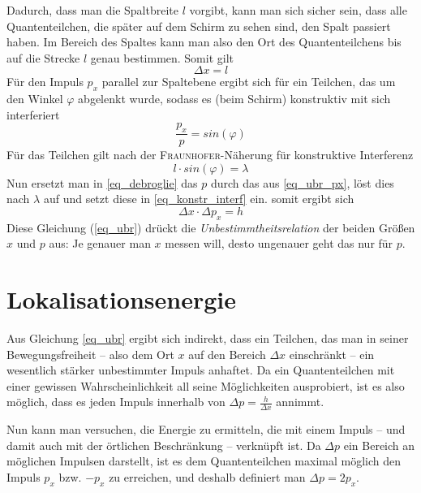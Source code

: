 Dadurch, dass man die Spaltbreite $l$ vorgibt, kann man sich sicher sein, dass alle Quantenteilchen, die später auf dem Schirm zu sehen sind, den Spalt passiert haben. Im Bereich des Spaltes kann man also den Ort des Quantenteilchens bis auf die Strecke $l$ genau bestimmen. Somit gilt 
\begin{equation}
   \Delta x = l
   \label{eq_ubr_x}
\end{equation}
Für den Impuls $p_x$ parallel zur Spaltebene ergibt sich für ein Teilchen, das um den Winkel $\varphi$ abgelenkt wurde, sodass es (beim Schirm) konstruktiv mit sich interferiert
\begin{equation}
   \frac{p_x}{p} = sin(\varphi)
   \label{eq_ubr_px}
\end{equation}
Für das Teilchen gilt nach der \textsc{Fraunhofer}-Näherung für konstruktive Interferenz
\begin{equation}
l \cdot sin(\varphi) = \lambda   
\label{eq_konstr_interf}
\end{equation}
Nun ersetzt man in \ref{eq_debroglie} das $p$ durch das aus \ref{eq_ubr_px}, löst dies nach $\lambda$ auf und setzt diese in \ref{eq_konstr_interf} ein. somit ergibt sich
\begin{equation}
   \Delta x \cdot \Delta p_x = h
   \label{eq_ubr}
\end{equation}
Diese Gleichung (\ref{eq_ubr}) drückt die \emph{Unbestimmtheitsrelation} der beiden Größen $x$ und $p$ aus: Je genauer man $x$ messen will, desto ungenauer geht das nur für $p$.





	\section{Lokalisationsenergie}

Aus Gleichung \ref{eq_ubr} ergibt sich indirekt, dass ein Teilchen, das man in seiner Bewegungsfreiheit -- also dem Ort $x$ auf den Bereich $\Delta x$ einschränkt -- ein wesentlich stärker unbestimmter Impuls anhaftet. Da ein Quantenteilchen mit einer gewissen Wahrscheinlichkeit all seine Möglichkeiten ausprobiert, ist es also möglich, dass es jeden Impuls innerhalb von $\Delta p = \frac{h}{\Delta x}$ annimmt.

Nun kann man versuchen, die Energie zu ermitteln, die mit einem Impuls -- und damit auch mit der örtlichen Beschränkung -- verknüpft ist. Da $\Delta p$ ein Bereich an möglichen Impulsen darstellt, ist es dem Quantenteilchen maximal möglich den Impuls $p_x$ bzw. $-p_x$ zu erreichen, und deshalb definiert man $\Delta p = 2p_x$.

